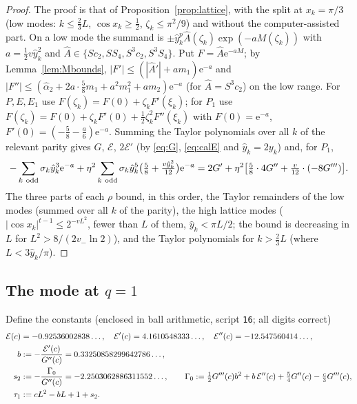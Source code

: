 \documentclass[11pt,a4paper]{article}
\theoremstyle{definition}
\theoremstyle{remark}
\newcommand{\ee}{\mathrm{e}}
\begin{document}
\begin{proof}
The proof is that of Proposition~\ref{prop:lattice}, with the split at $x_k=\pi/3$ (low modes: $k\le\frac23L$,
$\cos x_k\ge\frac12$, $\zeta_k\le\pi^2/9$) and without the computer-assisted part. On a low mode the summand is
$\pm\hat y_k^p\hat A(\zeta_k)\exp(-aM(\zeta_k))$ with $a=\frac12v\hat y_k^2$ and
$\hat A\in\{Sc_2,SS_4,S^3c_2,S^3S_4\}$. Put $F=\hat A\ee^{-aM}$; by Lemma~\ref{lem:Mbounds},
$|F'|\le(|\hat A'|+am_1)\ee^{-a}$ and $|F''|\le(\hat\alpha_2+2a\cdot\frac58m_1+a^2m_1^2+am_2)\ee^{-a}$ (for
$\hat A=S^3c_2$) on the low range. For $P,E,E_1$ use $F(\zeta_k)=F(0)+\zeta_kF'(\xi_k)$; for $P_1$ use
$F(\zeta_k)=F(0)+\zeta_kF'(0)+\frac12\zeta_k^2F''(\xi_k)$ with $F(0)=\ee^{-a}$,
$F'(0)=(-\frac58-\frac a6)\ee^{-a}$. Summing the Taylor polynomials over all $k$ of the relevant parity gives
$G$, $\mathcal E$, $2\mathcal E'$ (by \eqref{eq:G}, \eqref{eq:calE} and $\hat y_k=2y_k$) and, for $P_1$,
\[
  -\sum_{k\ \rm odd}\sigma_k\hat y_k^3\ee^{-a}+\eta^2\sum_{k\ \rm odd}\sigma_k\hat y_k^5\bigl(\tfrac58+\tfrac{v\hat y_k^2}{12}\bigr)\ee^{-a}
  =2G'+\eta^2\bigl[\tfrac58\cdot4G''+\tfrac v{12}\cdot(-8G''')\bigr].
\]
The three parts of each $\rho$ bound, in this order, the Taylor remainders of the low modes (summed over all $k$ of
the parity), the high lattice modes ($|\cos x_k|^{t-1}\le2^{-vL^2}$, fewer than $L$ of them, $\hat y_k<\pi L/2$; the
bound is decreasing in $L$ for $L^2>8/(2v_-\ln2)$), and the Taylor polynomials for $k>\frac23L$ (where
$L<3\hat y_k/\pi$).
\end{proof}

\subsection{The mode at \texorpdfstring{$q=1$}{q=1}}

Define the constants (enclosed in ball arithmetic, script \texttt{16}; all digits correct)
\begin{align}
  \mathcal E(c)&=-0.92536002838\ldots,\quad \mathcal E'(c)=4.1610548333\ldots,\quad\mathcal E''(c)=-12.547560414\ldots,\notag\\
  b&:=-\frac{\mathcal E'(c)}{G''(c)}=0.33250858299642786\ldots,\label{eq:b}\\
  s_2&:=-\frac{\Gamma_0}{G''(c)}=-2.2503062886311552\ldots,\qquad
  \Gamma_0:=\tfrac12G'''(c)b^2+b\,\mathcal E''(c)+\tfrac54G''(c)-\tfrac c3G'''(c),\notag\\
  \tau_1&:=cL^2-bL+1+s_2 .\notag
\end{align}
\end{document}

